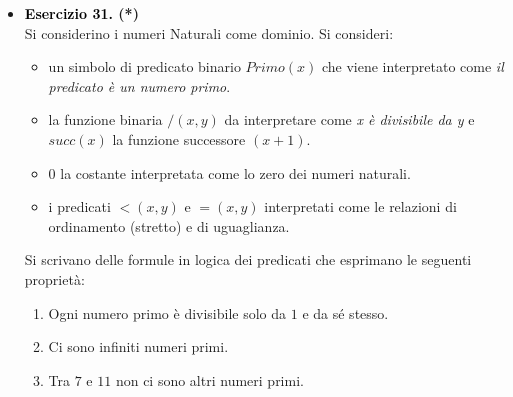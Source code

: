 \documentclass[a4paper,10pt]{article}
\makeatletter
\newcommand{\EsercitazioneNum}{12}
\newcommand{\Data}{04/12/2025}
\newcommand{\DocType}{Esercitazione} %
\newcommand{\FullTitle}{\DocType\ \EsercitazioneNum}
\newcommand{\Header}{
\noindent
  \small \textbf{Computabilità, Complessità e Logica - a.a. 2025/26} \hfill \textbf{\FullTitle} \\[0.2cm]
  \scriptsize Matteo Liotta, \texttt{matteo.liotta@studenti.units.it} \hfill \Data \\[0.2cm]
  \noindent\makebox[\linewidth]{\rule{\linewidth}{0.4pt}} \\[0.3cm]}
\newcommand{\NewPageHeader}{
  \vfill
  \noindent\makebox[\linewidth]{\rule{\linewidth}{0.4pt}}
  \newpage
  {\Header}
}
\makeatother
\begin{document}
{\begin{itemize}[label=, leftmargin=0pt]
\begin{osservazioni}
    \begin{center}
    \textit{Per ogni scelta di un numero $x$, esistono sicuramente due numeri $y$ e $z$ tali per cui $x$ sia uguale alla loro somma.}
    \end{center}
    Da cui la riscrittura è automatica:
    $$\forall x\exists y\exists w. =\bigg( x, +(y,w) \bigg)$$
    Possiamo anche formalizzare l'imposizione che questi due numeri siano diversi da $x$ o tra loro, semplicemente aggiungendo condizioni con $\land$ su $y,w$ e $x$ (e volendo $0$). 
    \end{osservazioni}
    \NewPageHeader
    \begin{osservazioni}
    \textbf{3.} Consideriamo la proprietà in cui \textit{a somma di due numeri dispari è un numero pari}. Possiamo rileggerla così:
    \begin{center}
    \textit{Per ogni scelta di un numero $x$ e $y$, il fatto che entrambi siano godano della proprietà di essere dispari implica che il risultato della loro somma sia un elemento del dominio che goda di parità}.
    \end{center}
    Allora la riscrittura è la seguente:

    $$\forall x\forall z. \bigg[ \bigg(D(x)\land D(y)\bigg)\rightarrow P(\ +(x,y)\ )\bigg]$$
    
    \end{osservazioni}

    \item \textbf{\textcolor{black}{Esercizio 31.} (*)}\\ 	
    Si considerino i numeri Naturali come dominio. Si consideri:
    
    \begin{itemize}
    \item un simbolo di predicato binario $Primo(x)$ che viene interpretato come \textit{il predicato è un numero primo}. 
    \item la funzione binaria $/(x, y)$ da interpretare come \textit{x è divisibile da y} e $succ(x)$ la funzione successore $(x+1)$. 
    \item $0$ la costante interpretata come lo zero dei numeri naturali. 
    \item i predicati $< (x, y)$ e $= (x, y)$ interpretati come le relazioni di ordinamento (stretto) e di uguaglianza. 
    \end{itemize}
    Si scrivano delle formule in logica dei predicati che esprimano le seguenti proprietà:
    \begin{enumerate}
        \item Ogni numero primo è divisibile solo da $1$ e da sé stesso.
        \item Ci sono infiniti numeri primi.
        \item Tra $7$ e $11$ non ci sono altri numeri primi.\\[0.1cm]
    

\end{enumerate}
\end{itemize}}
\end{document}
